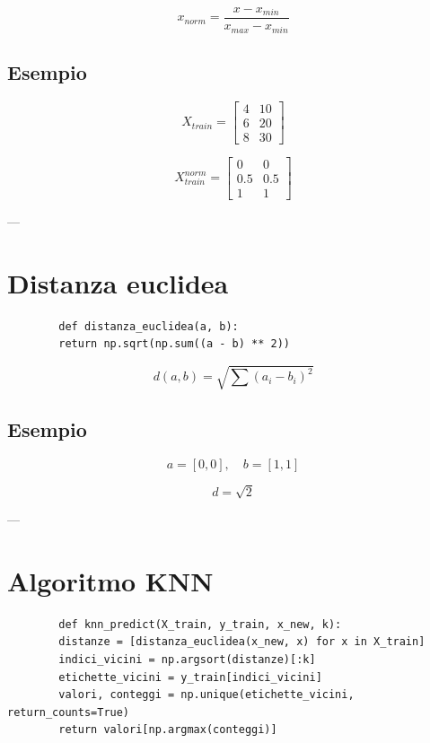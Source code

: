 \documentclass[a4paper,12pt]{article}
\begin{document}
	\[
	x_{norm} = \frac{x - x_{min}}{x_{max} - x_{min}}
	\]
	
	\subsection{Esempio}
	
	\[
	X_{train} =
	\begin{bmatrix}
		4 & 10 \\
		6 & 20 \\
		8 & 30
	\end{bmatrix}
	\]
	
	\[
	X_{train}^{norm} =
	\begin{bmatrix}
		0 & 0 \\
		0.5 & 0.5 \\
		1 & 1
	\end{bmatrix}
	\]
	
	---
	
	\section{Distanza euclidea}
	
	\begin{lstlisting}
		def distanza_euclidea(a, b):
		return np.sqrt(np.sum((a - b) ** 2))
	\end{lstlisting}
	
	\[
	d(a,b) = \sqrt{\sum (a_i - b_i)^2}
	\]
	
	\subsection{Esempio}
	
	\[
	a = [0,0], \quad b = [1,1]
	\]
	
	\[
	d = \sqrt{2}
	\]
	
	---
	
	\section{Algoritmo KNN}
	
	\begin{lstlisting}
		def knn_predict(X_train, y_train, x_new, k):
		distanze = [distanza_euclidea(x_new, x) for x in X_train]
		indici_vicini = np.argsort(distanze)[:k]
		etichette_vicini = y_train[indici_vicini]
		valori, conteggi = np.unique(etichette_vicini, return_counts=True)
		return valori[np.argmax(conteggi)]
	\end{lstlisting}
	
\end{document}
